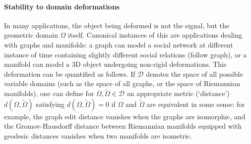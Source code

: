 \paragraph{Stability to domain deformations}
In many applications, the object being deformed is not the signal, but the geometric domain $\Omega$ itself. Canonical instances of this are applications dealing with graphs and manifolds: a graph can model a social network at different instance of time containing slightly different social relations (follow graph), or a manifold can model a 3D object undergoing non-rigid deformations. 
This deformation can be quantified as follows. If $\mathcal{D}$ denotes the space of all possible variable domains (such as the space of all graphs, or the space of Riemannian manifolds), one can define for $\Omega, \tilde{\Omega} \in \mathcal{D}$   an appropriate metric (`distance') $d(\Omega, \tilde{\Omega})$ satisfying $d(\Omega,\tilde{\Omega})=0$ if $\Omega$ and $\tilde{\Omega}$ are equivalent in some sense: for example, the graph edit distance vanishes when the graphs are isomorphic, and the Gromov-Hausdorff distance between Riemannian manifolds equipped with geodesic distances vanishes when two manifolds are isometric. 


